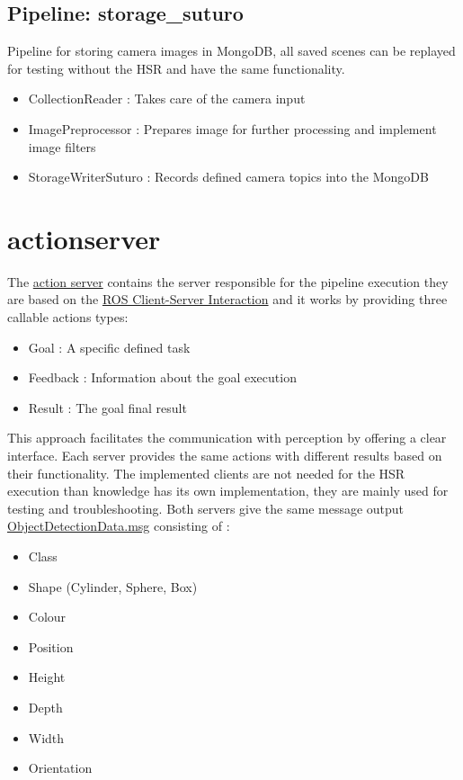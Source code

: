 \documentclass[main.tex]{subfiles}
\begin{document}
            \subsection{Pipeline: storage\_suturo} 
Pipeline for storing camera images in MongoDB, all saved scenes can be replayed for testing without the HSR and have the same functionality. 
\begin{itemize}
    \item CollectionReader : Takes care of the camera input
    \item ImagePreprocessor : Prepares image for further processing and implement image filters 
    \item StorageWriterSuturo :  Records defined camera topics into the MongoDB
\end{itemize}

        \section{actionserver}
The \href{https://github.com/SUTURO/suturo_perception/tree/master/actionserver}{action server} contains the server responsible for the pipeline execution they are based on the \href{http://wiki.ros.org/actionlib}{ROS Client-Server Interaction} and it works by providing three callable actions types:
\begin{itemize}
    \item Goal : A specific defined task 
    \item Feedback : Information about the goal execution  
    \item Result : The goal final result 
\end{itemize}
This approach facilitates the communication with perception by offering a clear interface.
Each server provides the same actions with different results based on their functionality.
The implemented clients are not needed for the HSR execution than knowledge has its own implementation, they are mainly used for testing and troubleshooting. 
Both servers give the same message output \href{https://github.com/SUTURO/suturo_resources/blob/master/messages/suturo_perception_msgs/msg/ObjectDetectionData.msg}{ObjectDetectionData.msg} consisting of : 

    \begin{itemize}
    \item Class
    \item Shape (Cylinder, Sphere, Box)
    \item Colour
    \item Position
    \item Height
    \item Depth
    \item Width
    \item Orientation
    \end{itemize}
\end{document}
